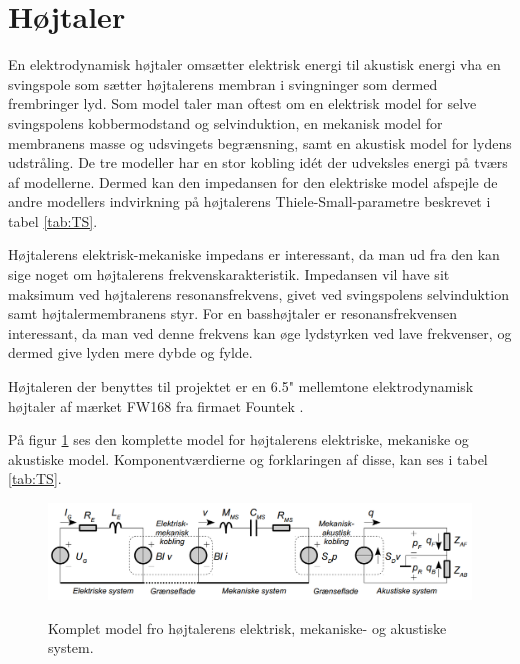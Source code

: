 \section{Højtaler}


En elektrodynamisk højtaler omsætter elektrisk energi til akustisk energi vha en svingspole som sætter højtalerens membran i svingninger som dermed frembringer lyd. Som model taler man oftest om en elektrisk model for selve svingspolens kobbermodstand og selvinduktion, en mekanisk model for membranens masse og udsvingets begrænsning, samt en akustisk model for lydens udstråling.
De tre modeller har en stor kobling idét der udveksles energi på tværs af modellerne. Dermed kan den impedansen for den elektriske model afspejle de andre modellers indvirkning på højtalerens Thiele-Small-parametre beskrevet i tabel \ref{tab:TS}.

Højtalerens elektrisk-mekaniske impedans er interessant, da man ud fra den kan sige noget om højtalerens frekvenskarakteristik. Impedansen vil have sit maksimum ved højtalerens resonansfrekvens, givet ved svingspolens selvinduktion samt højtalermembranens styr. For en basshøjtaler er resonansfrekvensen interessant, da man ved denne frekvens kan øge lydstyrken ved lave frekvenser, og dermed give lyden mere dybde og fylde.

Højtaleren der benyttes til projektet er en 6.5" mellemtone elektrodynamisk højtaler af mærket FW168\cite{FW168} fra firmaet Fountek \cite{Fountek}. 

På figur \ref{fig:kompletmodel} ses den komplette model for højtalerens elektriske, mekaniske og akustiske model.\citep{Elektroakustik} Komponentværdierne og forklaringen af disse, kan ses i tabel \ref{tab:TS}.

\begin{figure}[H]
	\centering
	\includegraphics[width=\textwidth]{Pics/kompletmodel.PNG}
	\label{fig:kompletmodel}
	\caption{Komplet model fro højtalerens elektrisk, mekaniske- og akustiske system. } 
\end{figure}

